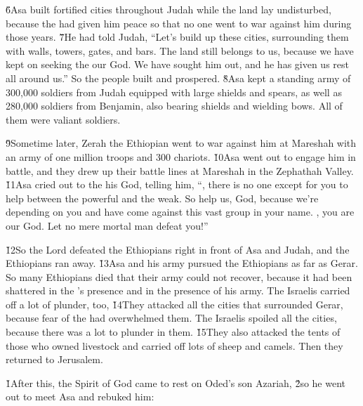 \v{6}Asa built fortified cities throughout Judah while the land lay undisturbed, because the  had given him peace so that no one went to war against him during those years. \v{7}He had told Judah, ``Let's build up these cities, surrounding them with walls, towers, gates, and bars. The land still belongs to us, because we have kept on seeking the  our God. We have sought him out, and he has given us rest all around us.'' So the people built and prospered. \v{8}Asa kept a standing army of 300,000 soldiers from Judah equipped with large shields and spears, as well as 280,000 soldiers from Benjamin, also bearing shields and wielding bows. All of them were valiant soldiers.

\v{9}Sometime later, Zerah the Ethiopian went to war against him at Mareshah with an army of one million troops and 300 chariots. \v{10}Asa went out to engage him in battle, and they drew up their battle lines at Mareshah in the Zephathah Valley. \v{11}Asa cried out to the  his God, telling him, ``, there is no one except for you to help between the powerful and the weak. So help us,  God, because we're depending on you and have come against this vast group in your name. , you are our God. Let no mere mortal man defeat you!''

\v{12}So the Lord defeated the Ethiopians right in front of Asa and Judah, and the Ethiopians ran away. \v{13}Asa and his army pursued the Ethiopians as far as Gerar. So many Ethiopians died that their army could not recover, because it had been shattered in the 's presence and in the presence of his army. The Israelis carried off a lot of plunder, too, \v{14}They attacked all the cities that surrounded Gerar, because fear of the  had overwhelmed them. The Israelis spoiled all the cities, because there was a lot to plunder in them. \v{15}They also attacked the tents of those who owned livestock and carried off lots of sheep and camels. Then they returned to Jerusalem.

\v{1}After this, the Spirit of God came to rest on Oded's son Azariah, \v{2}so he went out to meet Asa and rebuked him:

